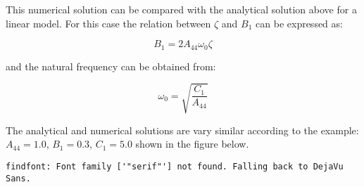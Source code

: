     

    This numerical solution can be compared with the analytical solution
above for a linear model. For this case the relation between \(\zeta\)
and \(B_1\) can be expressed as:
 
            
    
    \begin{equation}
B_{1} = 2 A_{44} \omega_{0} \zeta
\label{eq:equation}
\end{equation}

    

    and the natural frequency can be obtained from:
 
            
    
    \begin{equation}
\omega_{0} = \sqrt{\frac{C_{1}}{A_{44}}}
\label{eq:equation}
\end{equation}

    

    The analytical and numerical solutions are vary similar according to the
example: \(A_{44} = 1.0\), \(B_1 = 0.3\), \(C_1 = 5.0\) shown in the
figure below.

    \begin{Verbatim}[commandchars=\\\{\}]
findfont: Font family ['"serif"'] not found. Falling back to DejaVu Sans.
    \end{Verbatim}

    \begin{center}
    \end{center}
    { \hspace*{\fill} \\}
    
    